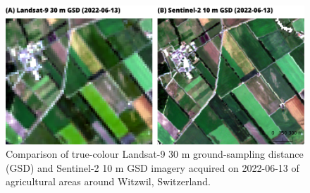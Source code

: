 \begin{figure}[H]
    \centering
    \includegraphics[width=\textwidth]{07-Discussion/img/comparison_l9-s2_witzwil22.png}
    \caption{Comparison of true-colour Landsat-9 30 m ground-sampling distance (GSD) and Sentinel-2 10 m GSD imagery acquired on 2022-06-13 of agricultural areas around Witzwil, Switzerland.}
    \label{fig:discussion-l9-vs-s2}
\end{figure}

